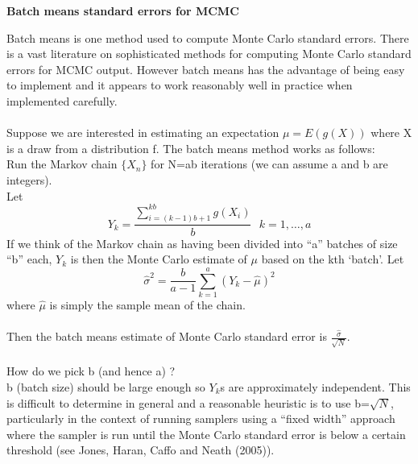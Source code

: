 \documentclass[11pt]{article}
\begin{document}
\pagestyle{empty}
\begin{center}
\Large
{\bf  Batch means standard errors for MCMC}\\
\end{center}
Batch means is one method used to compute Monte Carlo standard errors.
There is a vast literature on sophisticated methods for computing
Monte Carlo standard errors for MCMC output. However batch means has
the advantage of being easy to implement and it appears to work
reasonably well in practice when implemented carefully.\\\\
Suppose we are interested in estimating an expectation $\mu=E(g(X))$
where X is a draw from a distribution f.
The batch means method works as follows:\\
Run the Markov chain $\{X_n\}$ for N=ab iterations (we can assume a and b are integers).\\
Let $$Y_k=\frac{\sum_{i=(k-1)b+1}^{kb} g(X_i)}{b} \:\:\: k=1,\dots,a $$
If we think of
the Markov chain as having been divided into ``a'' batches of size
``b'' each, $Y_k$ is then the Monte Carlo estimate of $\mu$ based on
the kth `batch'. Let $$\hat{\sigma}^2=\frac{b}{a-1} \sum_{k=1}^a
(Y_k-\hat{\mu})^2$$
where $\hat{\mu}$ is simply the sample mean of the chain.\\\\
Then the batch means estimate of Monte Carlo standard error is $\frac{\hat{\sigma}}{\sqrt{N}}$.\\\\ %
How do we pick b (and hence a) ? \\
b (batch size) should be large enough so $Y_k$s are approximately
independent. This is difficult to determine in general and a
reasonable heuristic is to use b=$\sqrt{N}$, particularly in the
context of running samplers using a ``fixed width'' approach where the
sampler is run until the Monte Carlo standard error is below a certain
threshold (see Jones, Haran, Caffo and Neath (2005)).
\end{document}
